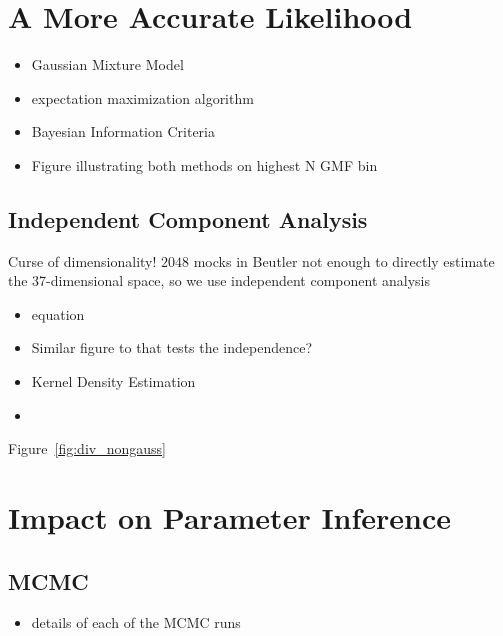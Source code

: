 \documentclass[12pt, letterpaper, preprint]{aastex}
\newcommand{\bitem}{\begin{itemize}}
\newcommand{\eitem}{\end{itemize}}
\begin{document}
\section{A More Accurate Likelihood} 
\bitem
    \item Gaussian Mixture Model 
    \item expectation maximization algorithm \cite{dempster1977}
    \item Bayesian Information Criteria 
    \item Figure illustrating both methods on highest N GMF bin 
\eitem

\subsection{Independent Component Analysis} 
Curse of dimensionality! $2048$ mocks in Beutler not enough to directly estimate 
the 37-dimensional space, so we use independent component analysis 
\cite{hartlap2009}
\bitem
    \item equation 
    \item Similar figure to \cite{hartlap2009} that tests the independence? 
    \item Kernel Density Estimation 
    \item 
\eitem
Figure~\ref{fig:div_nongauss}

\section{Impact on Parameter Inference}
\subsection{MCMC}
\bitem
    \item details of each of the MCMC runs
\eitem
\end{document}
